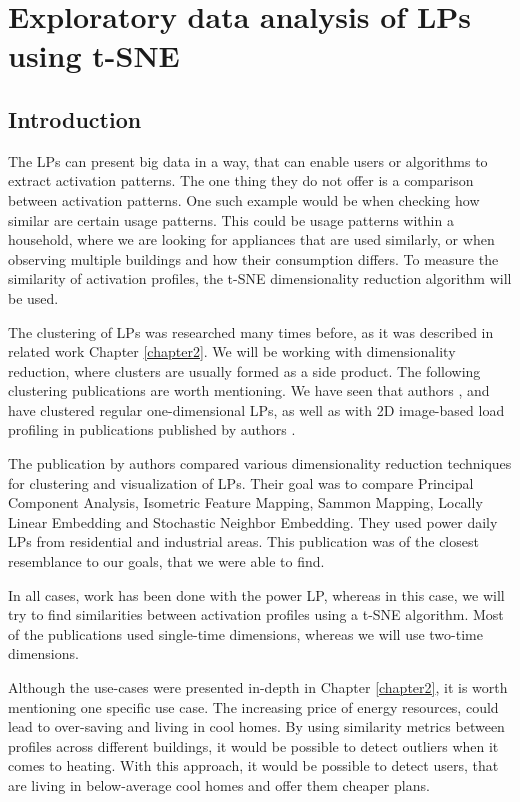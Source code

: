 \chapter{Exploratory data analysis of LPs using t-SNE} 

\label{chapter5} 

\section{Introduction}

The LPs can present big data in a way, that can enable users or algorithms to extract activation patterns.
The one thing they do not offer is a comparison between activation patterns.
One such example would be when checking how similar are certain usage patterns.
This could be usage patterns within a household, where we are looking for appliances that are used similarly,
or when observing multiple buildings and how their consumption differs. 
To measure the similarity of activation profiles, the t-SNE dimensionality reduction algorithm will be used.

The clustering of LPs was researched many times before, as it was described in related work Chapter \ref{chapter2}.
We will be working with dimensionality reduction, where clusters are usually formed as a side product.
The following clustering publications are worth mentioning.
We have seen that authors \cite{GERBEC2005}, \cite{Jeong2021} and \cite{Joana2012} have clustered regular one-dimensional LPs, as well as with 2D image-based load profiling in publications published by authors \cite{Park2019}. 

The publication by authors \cite{sne_energ} compared various dimensionality reduction techniques for clustering and visualization of LPs.
Their goal was to compare Principal Component Analysis, Isometric Feature Mapping, Sammon Mapping, Locally Linear Embedding and Stochastic Neighbor Embedding.
They used power daily LPs from residential and industrial areas.
This publication was of the closest resemblance to our goals, that we were able to find. 

In all cases, work has been done with the power LP, whereas in this case, we will try to find similarities between activation profiles using a t-SNE algorithm.
Most of the publications used single-time dimensions, whereas we will use two-time dimensions.

Although the use-cases were presented in-depth in Chapter \ref{chapter2}, it is worth mentioning one specific use case.
The increasing price of energy resources, could lead to over-saving and living in cool homes.
By using similarity metrics between profiles across different buildings, it would be possible to detect outliers when it comes to heating. 
With this approach, it would be possible to detect users, that are living in below-average cool homes and offer them cheaper plans. 



